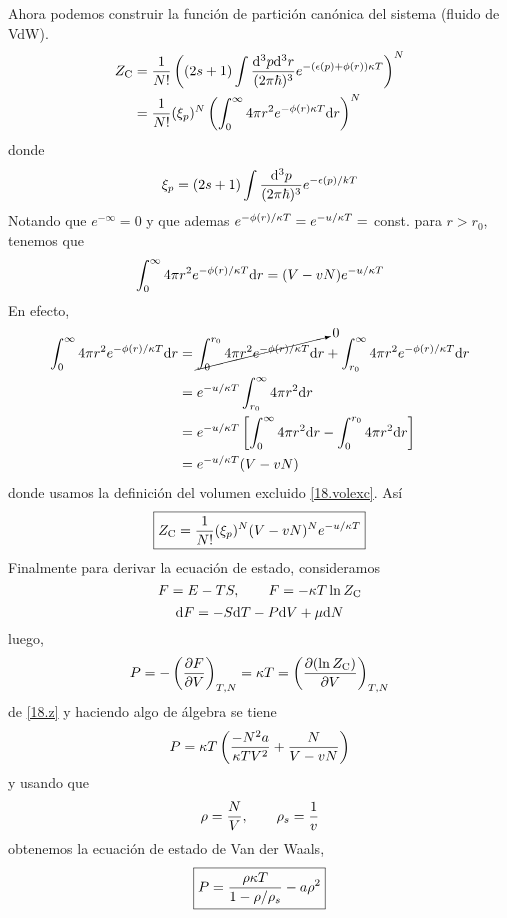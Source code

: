 Ahora podemos construir la función de partición canónica del sistema (fluido de VdW).
\begin{align}
  Z_{\rm C} &=\frac{1}{N!}\left((2s+1)\int\frac{\dd^3p\dd^3r}{(2\pi\hbar)^3}e^{-(\epsilon(p)+\phi (r))\kappa T}\right)^N\\
  &=\frac{1}{N!}(\xi_p)^N\left(\int_0^\infty 4\pi r^2e^{-\phi(r)\/\kappa T}\dd r\right)^N
\end{align}
donde
\begin{equation}
  \xi_p=(2s+1)\int\frac{\dd^3p}{(2\pi\hbar)^3}e^{-\epsilon(p)/k T}
\end{equation}
Notando que $e^{-\infty}=0$ y que ademas $e^{-\phi(r)/\kappa T}=e^{-u/\kappa T}=$ const. para $r>r_0$, tenemos que
\begin{equation}
  \int_0^\infty 4\pi r^2e^{-\phi(r)/\kappa T}\dd r=(V-vN)e^{-u/\kappa T}
\end{equation}
En efecto,
\begin{align}
  \int_0^\infty 4\pi r^2e^{-\phi(r)/\kappa T}\dd r&=\cancelto{0}{\int_0^{r_0} 4\pi r^2e^{-\phi(r)/\kappa T}\dd r}+\int_{r_0}^\infty 4\pi r^2e^{-\phi(r)/\kappa T}\dd r\\
  &=e^{-u/\kappa T}\int_{r_0}^\infty 4\pi r^2\dd r\\
  &=e^{-u/\kappa T}\left[\int_{0}^\infty 4\pi r^2\dd r- \int_{0}^{r_0} 4\pi r^2\dd r\right]\\
  &=e^{-u/\kappa T}(V-vN)
\end{align}
donde usamos la definición del volumen excluido \eqref{18.volexc}. Así
\begin{equation}\label{18.z}
 \boxed{ Z_{\rm C}=\frac{1}{N!}(\xi_p)^N(V-vN)^Ne^{-u/\kappa T}}
\end{equation}
Finalmente para derivar la ecuación de estado, consideramos
\begin{equation}
  F=E-TS,\qquad F=-\kappa T\ln Z_{\rm C} 
\end{equation}
\begin{equation}
  \dd F=-S\dd T-P\dd V+\mu \dd N
\end{equation}
luego,
\begin{equation}
  P=-\left(\pdv{F}{V}\right)_{T,N}=\kappa T=\left(\pdv{(\ln Z_{\rm C})}{V}\right)_{T,N}
\end{equation}
de \eqref{18.z} y haciendo algo de álgebra se tiene
\begin{equation}
  P=\kappa T\left(\frac{-N^2a}{\kappa T V^2}+\frac{N}{V-vN}\right)
\end{equation}
y usando que
\begin{equation}
  \rho=\frac{N}{V},\qquad \rho_s=\frac{1}{v}
\end{equation}
obtenemos la ecuación de estado de Van der Waals,
\begin{equation}
\boxed{  P=\frac{\rho\kappa T}{1-\rho/\rho_s}-a\rho^2}
\end{equation}

